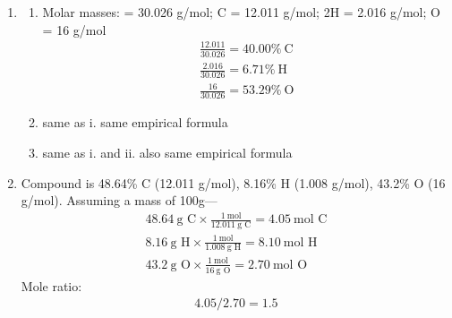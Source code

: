 \documentclass[a4paper, 12pt]{article}
\newcommand{\lab}[1]{\: \text{#1}}
\begin{document}
\begin{enumerate}[label=\alph*.]
\begin{enumerate}[label=\roman*.]
\item 
\begin{gather*}
\text{Molar mass of \ce{Fe2O3}} = 159.687 \lab{g/mol} \\
150 \lab{g} = \frac{1 \lab{mol}}{159.687 \lab{g}} \approx \boxed{0.94 \lab{mol}}
\end{gather*}
\item
\begin{gather*}
\text{Molar mass of \ce{NO2}} = 46.01 \lab{g/mol} \\
10 \lab{mg} \times \frac{1 \lab{g}}{1000 \lab{mg}} \times \frac{1 \lab{mol}}{46.01 \lab{g}} \approx \boxed{0.000217 \lab{mol}}
\end{gather*}
\item
\begin{gather*}
1.5 \times 10^{16} \lab{molecules} \times \frac{1 \lab{mol}}{6.022 \times 10^{23} \lab{molecules}} \approx \boxed{2.5 \times 10^{-1} \lab{mol}}
\end{gather*}
\end{enumerate}
\item
\begin{enumerate}[label=\roman*.]
\item Molar masses:  = 30.026 g/mol; C = 12.011 g/mol; 2H = 2.016 g/mol; O = 16 g/mol
\begin{gather*}
\frac{12.011}{30.026} = 40.00\% \lab{C} \\
\frac{2.016}{30.026} = 6.71\% \lab{H} \\
\frac{16}{30.026} = 53.29\% \lab{O}
\end{gather*}
\item same as i. same empirical formula
\item same as i. and ii. also same empirical formula
\end{enumerate}
\item Compound is 48.64\% C (12.011 g/mol), 8.16\% H (1.008 g/mol), 43.2\% O (16 g/mol). Assuming a mass of 100g---
\begin{gather*}
48.64 \lab{g C} \times \frac{1 \lab{mol}}{12.011 \lab{g C}} = 4.05 \lab{mol C} \\
8.16 \lab{g H} \times \frac{1 \lab{mol}}{1.008 \lab{g H}} = 8.10 \lab{mol H} \\
43.2 \lab{g O} \times \frac{1 \lab{mol}}{16 \lab{g O}} = 2.70 \lab{mol O}
\end{gather*}
Mole ratio:
\begin{gather*}
4.05/2.70 = 1.5 \\

\end{gather*}
\end{enumerate}
\end{document}
